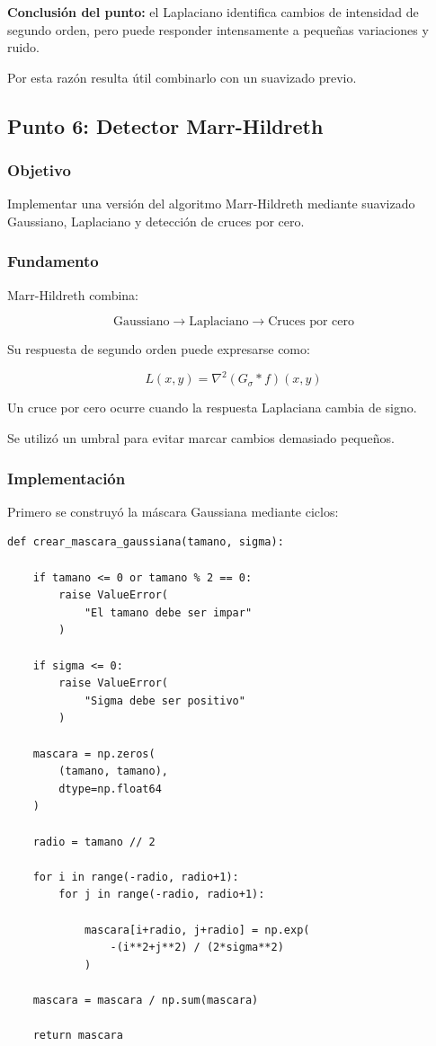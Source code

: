 \documentclass[11pt,letterpaper]{article}
\begin{document}
\textbf{Conclusión del punto:}
el Laplaciano identifica cambios
de intensidad de segundo orden,
pero puede responder intensamente
a pequeñas variaciones y ruido.

Por esta razón resulta útil combinarlo
con un suavizado previo.

\subsection{Punto 6: Detector Marr-Hildreth}

\subsubsection*{Objetivo}

Implementar una versión del algoritmo
Marr-Hildreth mediante suavizado
Gaussiano, Laplaciano y detección
de cruces por cero.

\subsubsection*{Fundamento}

Marr-Hildreth combina:

\[
\text{Gaussiano}
\rightarrow
\text{Laplaciano}
\rightarrow
\text{Cruces por cero}
\]

Su respuesta de segundo orden puede
expresarse como:

\begin{equation}
L(x,y)=
\nabla^2(G_\sigma*f)(x,y)
\end{equation}

Un cruce por cero ocurre cuando
la respuesta Laplaciana cambia
de signo.

Se utilizó un umbral para evitar
marcar cambios demasiado pequeños.

\subsubsection*{Implementación}

Primero se construyó la máscara
Gaussiana mediante ciclos:

\begin{lstlisting}
def crear_mascara_gaussiana(tamano, sigma):

    if tamano <= 0 or tamano % 2 == 0:
        raise ValueError(
            "El tamano debe ser impar"
        )

    if sigma <= 0:
        raise ValueError(
            "Sigma debe ser positivo"
        )

    mascara = np.zeros(
        (tamano, tamano),
        dtype=np.float64
    )

    radio = tamano // 2

    for i in range(-radio, radio+1):
        for j in range(-radio, radio+1):

            mascara[i+radio, j+radio] = np.exp(
                -(i**2+j**2) / (2*sigma**2)
            )

    mascara = mascara / np.sum(mascara)

    return mascara
\end{lstlisting}
\end{document}
